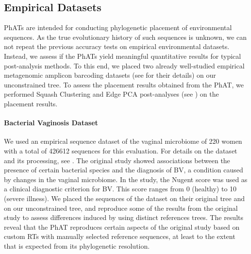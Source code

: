 
\subsection{Empirical Datasets}
\label{ch:AutomaticTrees:sec:Evaluation:sub:EmpiricalDatasets}

\acp{PhAT} are intended for conducting phylogenetic placement of environmental sequences.
As the true evolutionary history of such sequences is unknown,
we can not repeat the previous accuracy tests on empirical environmental datasets.
Instead, we assess if the \acp{PhAT} yield meaningful quantitative results for typical post-analysis methods.
To this end, we placed two already well-studied empirical metagenomic amplicon barcoding datasets
(see  for their details) on our unconstrained  tree.
To assess the placement results obtained from the \ac{PhAT},
we performed Squash Clustering and Edge PCA \citep{Matsen2011a} post-analyses
(see ) on the placement results.


\paragraph{Bacterial Vaginosis Dataset}
\label{ch:AutomaticTrees:sec:Evaluation:sub:EmpiricalDatasets:par:BV}

We used an empirical sequence dataset of the vaginal microbiome of 220 women
with a total of \num{426 612} sequences \citep{Srinivasan2012} for this evaluation.
For details on the dataset and its processing, see .
The original study showed associations between the presence of certain bacterial species
and the diagnosis of \acf{BV}, a condition caused by changes in the vaginal microbiome.
In the study, the Nugent score \citep{Nugent1991} was used as a clinical diagnostic criterion for \ac{BV}.
This score ranges from \num{0} (healthy) to \num{10} (severe illness).
We placed the sequences of the dataset on their original tree and on our unconstrained  tree,
and reproduce some of the results from the original study
to assess differences induced by using distinct references trees.
The results reveal that the \ac{PhAT} reproduces certain aspects of the original study %
based on custom \acp{RT} with manually selected reference sequences,
at least to the extent that is expected from its phylogenetic resolution.

